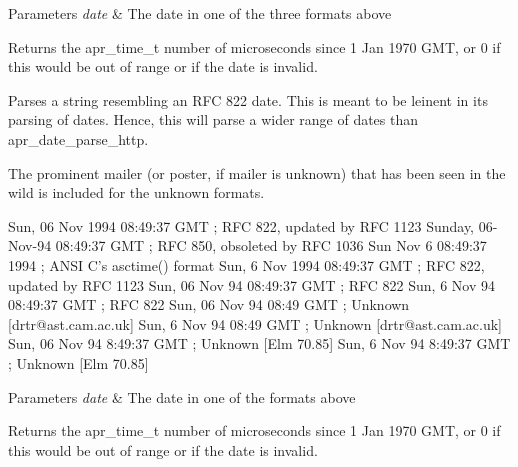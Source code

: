 \begin{DoxyParams}{Parameters}
{\em date} & The date in one of the three formats above \\
\hline
\end{DoxyParams}
\begin{DoxyReturn}{Returns}
the apr\+\_\+time\+\_\+t number of microseconds since 1 Jan 1970 G\+MT, or 0 if this would be out of range or if the date is invalid.
\end{DoxyReturn}
Parses a string resembling an R\+FC 822 date. This is meant to be leinent in its parsing of dates. Hence, this will parse a wider range of dates than apr\+\_\+date\+\_\+parse\+\_\+http.

The prominent mailer (or poster, if mailer is unknown) that has been seen in the wild is included for the unknown formats. 
\begin{DoxyPre}
    Sun, 06 Nov 1994 08:49:37 GMT  ; RFC 822, updated by RFC 1123
    Sunday, 06-Nov-94 08:49:37 GMT ; RFC 850, obsoleted by RFC 1036
    Sun Nov  6 08:49:37 1994       ; ANSI C's asctime() format
    Sun, 6 Nov 1994 08:49:37 GMT   ; RFC 822, updated by RFC 1123
    Sun, 06 Nov 94 08:49:37 GMT    ; RFC 822
    Sun, 6 Nov 94 08:49:37 GMT     ; RFC 822
    Sun, 06 Nov 94 08:49 GMT       ; Unknown [drtr@ast.cam.ac.uk] 
    Sun, 6 Nov 94 08:49 GMT        ; Unknown [drtr@ast.cam.ac.uk]
    Sun, 06 Nov 94 8:49:37 GMT     ; Unknown [Elm 70.85]
    Sun, 6 Nov 94 8:49:37 GMT      ; Unknown [Elm 70.85] 
\end{DoxyPre}



\begin{DoxyParams}{Parameters}
{\em date} & The date in one of the formats above \\
\hline
\end{DoxyParams}
\begin{DoxyReturn}{Returns}
the apr\+\_\+time\+\_\+t number of microseconds since 1 Jan 1970 G\+MT, or 0 if this would be out of range or if the date is invalid. 
\end{DoxyReturn}

